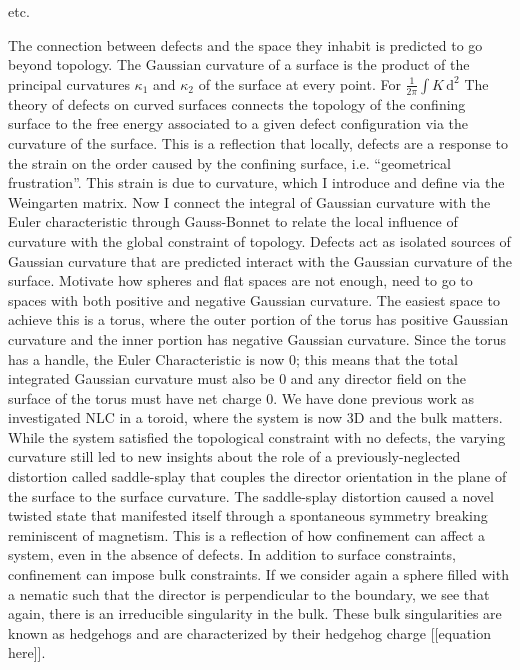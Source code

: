 etc.




The connection between defects and the space they inhabit is predicted to go beyond topology.
The Gaussian curvature of a surface is the product of the principal curvatures $\kappa_1$ and $\kappa_2$ of the surface at every point.
For
$
 \frac{1}{2\pi} \int K\, \textrm{d}^2$
The theory of defects on curved surfaces connects the topology of the confining surface to the free energy associated to a given defect configuration via the curvature of the surface.
This is a reflection that locally, defects are a response to the strain on the order caused by the confining surface, i.e. ``geometrical frustration''.
This strain is due to curvature, which I introduce and define via the Weingarten matrix.
Now I connect the integral of Gaussian curvature with the Euler characteristic through Gauss-Bonnet to relate the local influence of curvature with the global constraint of topology.
Defects act as isolated sources of Gaussian curvature that are predicted interact with the Gaussian curvature of the surface.
Motivate how spheres and flat spaces are not enough, need to go to spaces with both positive and negative Gaussian curvature.
The easiest space to achieve this is a torus, where the outer portion of the torus has positive Gaussian curvature and the inner portion has negative Gaussian curvature.
Since the torus has a handle, the Euler Characteristic is now 0; this means that the total integrated Gaussian curvature must also be 0 and any director field on the surface of the torus must have net charge 0.
We have done previous work as investigated NLC in a toroid, where the system is now 3D and the bulk matters.
While the system satisfied the topological constraint with no defects, the varying curvature still led to new insights about the role of a previously-neglected distortion called saddle-splay that couples the director orientation in the plane of the surface to the surface curvature.
The saddle-splay distortion caused a novel twisted state that manifested itself through a spontaneous symmetry breaking reminiscent of magnetism.
This is a reflection of how confinement can affect a system, even in the absence of defects.
In addition to surface constraints, confinement can impose bulk constraints.
If we consider again a sphere filled with a nematic such that the director is perpendicular to the boundary, we see that again, there is an irreducible singularity in the bulk.
These bulk singularities are known as hedgehogs and are characterized by their hedgehog charge [[equation here]].

